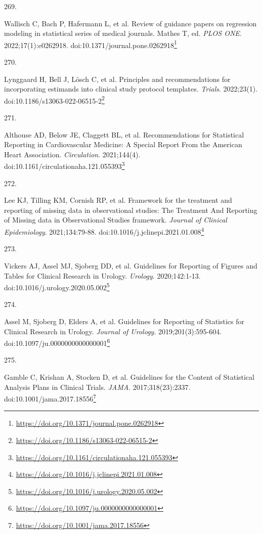 \documentclass[
  a4paper,
]{book}
\newlength{\cslhangindent}
\newlength{\csllabelwidth}
\newlength{\cslentryspacingunit} %
\newenvironment{CSLReferences}[2] %
 {%
  \setlength{\parindent}{0pt}
  \ifodd #1
  \let\oldpar\par
  \def\par{\hangindent=\cslhangindent\oldpar}
  \fi
  \setlength{\parskip}{#2\cslentryspacingunit}
 }%
 {}
\newcommand{\CSLLeftMargin}[1]{\parbox[t]{\csllabelwidth}{#1}}
\newcommand{\CSLRightInline}[1]{\parbox[t]{\linewidth - \csllabelwidth}{#1}\break}
\renewcommand{\href}[2]{#2\footnote{\url{#1}}}
\begin{document}
\begin{CSLReferences}{0}{0}
\leavevmode{}%
\CSLLeftMargin{269. }%
\CSLRightInline{Wallisch C, Bach P, Hafermann L, et al. Review of guidance papers on regression modeling in statistical series of medical journals. Mathes T, ed. \emph{PLOS ONE}. 2022;17(1):e0262918. doi:\href{https://doi.org/10.1371/journal.pone.0262918}{10.1371/journal.pone.0262918}}

\leavevmode{}%
\CSLLeftMargin{270. }%
\CSLRightInline{Lynggaard H, Bell J, Lösch C, et al. Principles and recommendations for incorporating estimands into clinical study protocol templates. \emph{Trials}. 2022;23(1). doi:\href{https://doi.org/10.1186/s13063-022-06515-2}{10.1186/s13063-022-06515-2}}

\leavevmode{}%
\CSLLeftMargin{271. }%
\CSLRightInline{Althouse AD, Below JE, Claggett BL, et al. Recommendations for Statistical Reporting in Cardiovascular Medicine: A Special Report From the American Heart Association. \emph{Circulation}. 2021;144(4). doi:\href{https://doi.org/10.1161/circulationaha.121.055393}{10.1161/circulationaha.121.055393}}

\leavevmode{}%
\CSLLeftMargin{272. }%
\CSLRightInline{Lee KJ, Tilling KM, Cornish RP, et al. Framework for the treatment and reporting of missing data in observational studies: The Treatment And Reporting of Missing data in Observational Studies framework. \emph{Journal of Clinical Epidemiology}. 2021;134:79-88. doi:\href{https://doi.org/10.1016/j.jclinepi.2021.01.008}{10.1016/j.jclinepi.2021.01.008}}

\leavevmode{}%
\CSLLeftMargin{273. }%
\CSLRightInline{Vickers AJ, Assel MJ, Sjoberg DD, et al. Guidelines for Reporting of Figures and Tables for Clinical Research in Urology. \emph{Urology}. 2020;142:1-13. doi:\href{https://doi.org/10.1016/j.urology.2020.05.002}{10.1016/j.urology.2020.05.002}}

\leavevmode{}%
\CSLLeftMargin{274. }%
\CSLRightInline{Assel M, Sjoberg D, Elders A, et al. Guidelines for Reporting of Statistics for Clinical Research in Urology. \emph{Journal of Urology}. 2019;201(3):595-604. doi:\href{https://doi.org/10.1097/ju.0000000000000001}{10.1097/ju.0000000000000001}}

\leavevmode{}%
\CSLLeftMargin{275. }%
\CSLRightInline{Gamble C, Krishan A, Stocken D, et al. Guidelines for the Content of Statistical Analysis Plans in Clinical Trials. \emph{JAMA}. 2017;318(23):2337. doi:\href{https://doi.org/10.1001/jama.2017.18556}{10.1001/jama.2017.18556}}


\end{CSLReferences}
\end{document}
